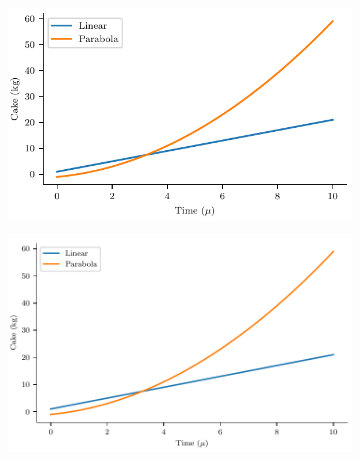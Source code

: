 \documentclass[a4paper,11pt]{report} %
\numberwithin{equation}{section}
\begin{document}
\begin{figure}
\centering
\begin{subfigure}{0.8\textwidth}
	\centering
	\includegraphics[width=1\linewidth]{fig/OneGoldenSmall.pdf}
	\caption{}
\end{subfigure}
\caption{}
\end{figure}

\begin{figure}
\centering
\begin{subfigure}{0.99\textwidth}
	\centering
	\includegraphics[width=1\linewidth]{fig/OneGoldenFull.pdf}
	\caption{}
\end{subfigure}
\caption{}
\end{figure}
\end{document}
